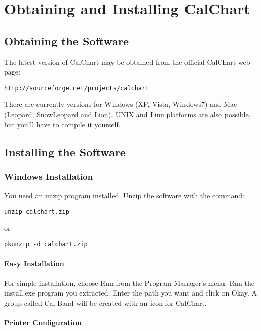 \chapter{Obtaining and Installing CalChart}\label{software}

\section{Obtaining the Software}\label{obtaining}

The latest version of CalChart may be obtained from the official
CalChart web page:

\begin{verbatim}
http://sourceforge.net/projects/calchart
\end{verbatim}

There are currently versions for Windows (XP, Vista, Windows7) and Mac (Leopard,
SnowLeopard and Lion).  UNIX and Linu platforms are also possible, but you'll
have to compile it yourself.

\section{Installing the Software}\label{installing}

\subsection{Windows Installation}\label{wininstall}

You need an unzip program installed.  Unzip the software with the
command:

\begin{verbatim}
unzip calchart.zip
\end{verbatim}
or
\begin{verbatim}
pkunzip -d calchart.zip
\end{verbatim}

\subsubsection{Easy Installation}\label{easyinstall}

For simple installation, choose Run from the Program Manager's menu.
Run the install.exe program you extracted.  Enter the path you want and
click on Okay.  A group called Cal Band will be created with an icon for
CalChart.

\subsubsection{Printer Configuration}\label{winprinter}

